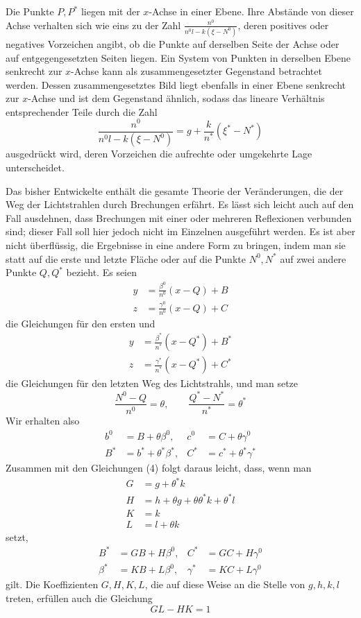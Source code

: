 Die Punkte $P,P^*$ liegen mit der $x$-Achse in einer Ebene. Ihre Abstände von dieser Achse verhalten sich wie eins zu der Zahl $\frac{n^0}{n^0l-k(\xi-N^0)}$, deren positives oder negatives Vorzeichen angibt, ob die Punkte auf derselben Seite der Achse oder auf entgegengesetzten Seiten liegen. Ein System von Punkten in derselben Ebene senkrecht zur $x$-Achse kann als zusammengesetzter Gegenstand betrachtet werden. Dessen zusammengesetztes Bild liegt ebenfalls in einer Ebene senkrecht zur $x$-Achse und ist dem Gegenstand ähnlich, sodass das lineare Verhältnis entsprechender Teile durch die Zahl
\[
\frac{n^0}{n^0l-k(\xi-N^0)}=g+\frac{k}{n^*}(\xi^*-N^*)
\]
ausgedrückt wird, deren Vorzeichen die aufrechte oder umgekehrte Lage unterscheidet.

Das bisher Entwickelte enthält die gesamte Theorie der Veränderungen, die der Weg der Lichtstrahlen durch Brechungen erfährt. Es lässt sich leicht auch auf den Fall ausdehnen, dass Brechungen mit einer oder mehreren Reflexionen verbunden sind; dieser Fall soll hier jedoch nicht im Einzelnen ausgeführt werden. Es ist aber nicht überflüssig, die Ergebnisse in eine andere Form zu bringen, indem man sie statt auf die erste und letzte Fläche oder auf die Punkte $N^0,N^*$ auf zwei andere Punkte $Q,Q^*$ bezieht. Es seien
\[
\begin{aligned}
y&=\frac{\beta^0}{n^0}(x-Q)+B\\
z&=\frac{\gamma^0}{n^0}(x-Q)+C
\end{aligned}
\]
die Gleichungen für den ersten und
\[
\begin{aligned}
y&=\frac{\beta^*}{n^*}(x-Q^*)+B^*\\
z&=\frac{\gamma^*}{n^*}(x-Q^*)+C^*
\end{aligned}
\]
die Gleichungen für den letzten Weg des Lichtstrahls, und man setze
\[
\frac{N^0-Q}{n^0}=\theta,\qquad \frac{Q^*-N^*}{n^*}=\theta^*
\]
Wir erhalten also
\[
\begin{aligned}
b^0&=B+\theta\beta^0,&c^0&=C+\theta\gamma^0\\
B^*&=b^*+\theta^*\beta^*,&C^*&=c^*+\theta^*\gamma^*
\end{aligned}
\]
Zusammen mit den Gleichungen (4) folgt daraus leicht, dass, wenn man
\[
\begin{aligned}
G&=g+\theta^*k\\
H&=h+\theta g+\theta\theta^*k+\theta^*l\\
K&=k\\
L&=l+\theta k
\end{aligned}
\]
setzt,
\[
\begin{aligned}
B^*&=GB+H\beta^0,&C^*&=GC+H\gamma^0\\
\beta^*&=KB+L\beta^0,&\gamma^*&=KC+L\gamma^0
\end{aligned}
\]
gilt. Die Koeffizienten $G,H,K,L$, die auf diese Weise an die Stelle von $g,h,k,l$ treten, erfüllen auch die Gleichung
\[
GL-HK=1
\]

